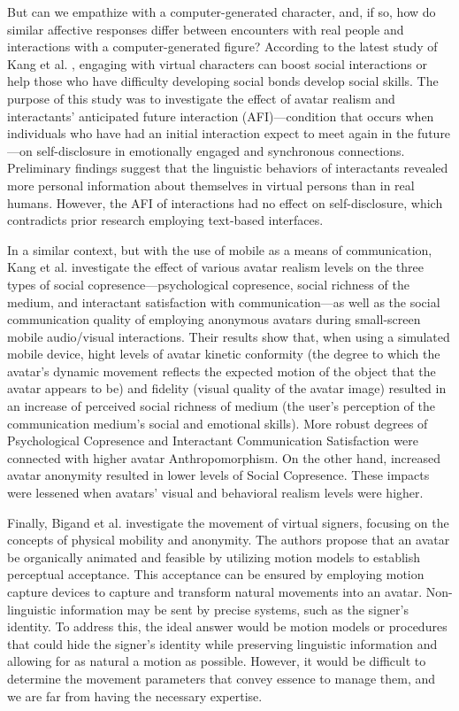 But can we empathize with a computer-generated character, and, if so, how do similar affective responses differ between encounters with real people and interactions with a computer-generated figure? According to the latest study of Kang et al. \cite{KAN10A}, engaging with virtual characters can boost social interactions or help those who have difficulty developing social bonds develop social skills. The purpose of this study was to investigate the effect of avatar realism and interactants' anticipated future interaction (AFI)---condition that occurs when individuals who have had an initial interaction expect to meet again in the future---on self-disclosure in emotionally engaged and synchronous connections. Preliminary findings suggest that the linguistic behaviors of interactants revealed more personal information about themselves in virtual persons than in real humans. However, the AFI of interactions had no effect on self-disclosure, which contradicts prior research employing text-based interfaces.

In a similar context, but with the use of mobile as a means of communication, Kang et al. \cite{KAN13} investigate the effect of various avatar realism levels on the three types of social copresence—psychological copresence, social richness of the medium, and interactant satisfaction with communication—as well as the social communication quality of employing anonymous avatars during small-screen mobile audio/visual interactions. Their results show that, when using a simulated mobile device, hight levels of avatar kinetic conformity (the degree to which the avatar's dynamic movement reflects the expected motion of the object that the avatar appears to be) and fidelity (visual quality of the avatar image) resulted in an increase of perceived social richness of medium (the user's perception of the communication medium's social and emotional skills). More robust degrees of Psychological Copresence and Interactant Communication Satisfaction were connected with higher avatar Anthropomorphism. On the other hand, increased avatar anonymity resulted in lower levels of Social Copresence. These impacts were lessened when avatars' visual and behavioral realism levels were higher.

Finally, Bigand et al. \cite{BIG19} investigate the movement of virtual signers, focusing on the concepts of physical mobility and anonymity. The authors propose that an avatar be organically animated and feasible by utilizing motion models to establish perceptual acceptance. This acceptance can be ensured by employing motion capture devices to capture and transform natural movements into an avatar. Non-linguistic information may be sent by precise systems, such as the signer's identity. To address this, the ideal answer would be motion models or procedures that could hide the signer's identity while preserving linguistic information and allowing for as natural a motion as possible. However, it would be difficult to determine the movement parameters that convey essence to manage them, and we are far from having the necessary expertise.

